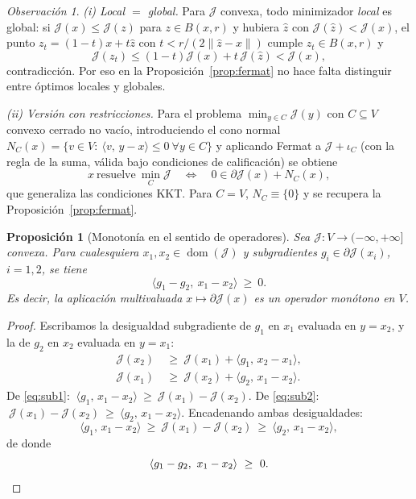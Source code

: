 \documentclass[12pt]{book}
\theoremstyle{definition}
\theoremstyle{plain}
\newtheorem{proposicion}{Proposición}[section]
\theoremstyle{remark}
\newtheorem{observacion}{Observación}[section]
\begin{document}
\begin{observacion}
\label{obs:fermat}
\emph{(i) Local $=$ global.} Para $\mathcal{J}$ convexa, todo
minimizador \emph{local} es global: si
$\mathcal{J}(x)\le\mathcal{J}(z)$ para $z\in B(x,r)$ y hubiera
$\hat z$ con $\mathcal{J}(\hat z)<\mathcal{J}(x)$, el punto
$z_{t}=(1-t)x+t\hat z$ con $t<r/(2\|\hat z-x\|)$ cumple
$z_{t}\in B(x,r)$ y
\[
\mathcal{J}(z_{t})\le(1-t)\mathcal{J}(x)
+t\,\mathcal{J}(\hat z)<\mathcal{J}(x),
\]
contradicci\'on. Por eso en la Proposici\'on~\ref{prop:fermat} no hace
falta distinguir entre \'optimos locales y globales.

\smallskip
\emph{(ii) Versi\'on con restricciones.} Para el problema
$\min_{y\in C}\mathcal{J}(y)$ con $C\subseteq V$ convexo cerrado no
vac\'io, introduciendo el cono normal
$N_{C}(x)=\{v\in V:\ \langle v,\,y-x\rangle\le0\ \forall y\in C\}$ y
aplicando Fermat a $\mathcal{J}+\iota_{C}$ (con la regla de la suma,
v\'alida bajo condiciones de calificaci\'on) se obtiene
\[
x\ \text{resuelve}\ \min_{C}\mathcal{J}
\quad\Longleftrightarrow\quad
0\in\partial\mathcal{J}(x)+N_{C}(x),
\]
que generaliza las condiciones KKT. Para $C=V$,
$N_{C}\equiv\{0\}$ y se recupera la
Proposici\'on~\ref{prop:fermat}.
\end{observacion}

\begin{proposicion}[Monoton\'ia en el sentido de operadores]
\label{prop:monotonia}
Sea $\mathcal{J}\colon V\to(-\infty,+\infty]$ convexa. Para cualesquiera
$x_{1},x_{2}\in\operatorname{dom}(\mathcal{J})$ y subgradientes
$g_{i}\in\partial\mathcal{J}(x_{i})$, $i=1,2$, se tiene
\[
\langle g_{1}-g_{2},\ x_{1}-x_{2}\rangle\ \ge\ 0.
\]
Es decir, la aplicaci\'on multivaluada
$x\mapsto\partial\mathcal{J}(x)$ es un operador \emph{mon\'otono} en
$V$.
\end{proposicion}

\begin{proof}
Escribamos la desigualdad subgradiente de $g_{1}$ en $x_{1}$ evaluada en
$y=x_{2}$, y la de $g_{2}$ en $x_{2}$ evaluada en $y=x_{1}$:
\begin{align}
\mathcal{J}(x_{2})\ &\ge\
\mathcal{J}(x_{1})+\langle g_{1},\,x_{2}-x_{1}\rangle,
\label{eq:sub1}\\[2pt]
\mathcal{J}(x_{1})\ &\ge\
\mathcal{J}(x_{2})+\langle g_{2},\,x_{1}-x_{2}\rangle.
\label{eq:sub2}
\end{align}
De \eqref{eq:sub1}:
$\ \langle g_{1},\,x_{1}-x_{2}\rangle
\ \ge\ \mathcal{J}(x_{1})-\mathcal{J}(x_{2})$.
De \eqref{eq:sub2}:
$\ \mathcal{J}(x_{1})-\mathcal{J}(x_{2})
\ \ge\ \langle g_{2},\,x_{1}-x_{2}\rangle$.
Encadenando ambas desigualdades:
\[
\langle g_{1},\,x_{1}-x_{2}\rangle
\ \ge\ \mathcal{J}(x_{1})-\mathcal{J}(x_{2})
\ \ge\ \langle g_{2},\,x_{1}-x_{2}\rangle,
\]
de donde
\[
\langle g_{1}-g_{2},\ x_{1}-x_{2}\rangle\ \ge\ 0. \qedhere
\]
\end{proof}
\end{document}
